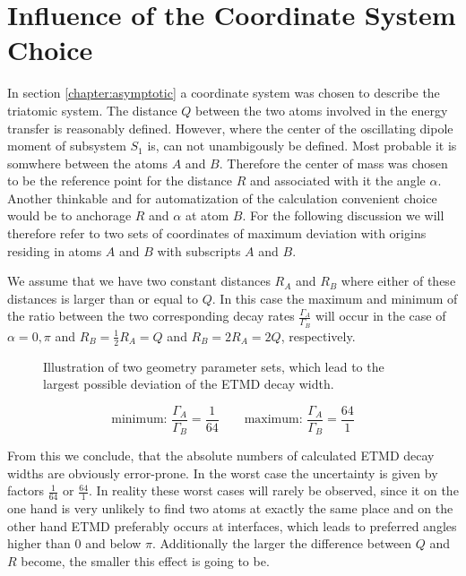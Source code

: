 \section{Influence of the Coordinate System Choice}
In section \ref{chapter:asymptotic} a coordinate
system was chosen to describe the
triatomic system. The distance $Q$ between the two atoms involved
in the energy transfer is reasonably defined. However, where the
center of the oscillating dipole moment of subsystem $S_1$ is, can
not unambigously be defined. Most
probable it is somwhere between the atoms $A$ and $B$. Therefore
the center of mass was chosen to be the reference point for the
distance $R$ and associated with it the angle $\alpha$.
Another thinkable and for automatization of the calculation
convenient choice would be to anchorage $R$ and $\alpha$ at
atom $B$.
For the following discussion we will therefore refer to two sets
of coordinates of maximum deviation with origins residing in atoms
$A$ and $B$ with subscripts $A$ and $B$.

We assume that we have two constant distances $R_{A}$ and $R_B$
where either of these distances is larger than or equal to $Q$.
In this case the maximum and minimum of the ratio between the two
corresponding decay rates $\frac{\Gamma_{A}}{\Gamma_B}$ will occur
in the case of $\alpha = 0,\pi$ and $R_B = \frac 12 R_{A} = Q$
and $R_B = 2 R_{A} = 2Q$, respectively.

\begin{figure}[h]
 \centering
 
 \caption{Illustration of two geometry parameter sets, which lead
          to the largest possible deviation of the ETMD decay width.}
 \label{}
\end{figure}

\begin{equation}
\text{minimum: } \frac{\Gamma_{A}}{\Gamma_B}= \frac{1}{64} \quad\quad
\text{maximum: } \frac{\Gamma_{A}}{\Gamma_B}= \frac{64}{1}
\end{equation}

From this we conclude, that the absolute numbers of calculated ETMD
decay widths are obviously error-prone. In the worst case the uncertainty
is given by factors $\frac{1}{64}$ or $\frac{64}{1}$.
In reality these worst cases will rarely be observed, since it on
the one hand is very unlikely to find two atoms at exactly the same place
and on the other hand ETMD preferably occurs at interfaces, which leads
to preferred angles higher than 0 and below $\pi$.
Additionally the larger the difference between $Q$ and $R$ become, the
smaller this effect is going to be.


